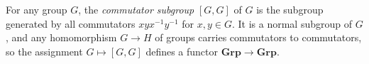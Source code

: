 For any group $G$, the \emph{commutator subgroup} $[G, G]$ of $G$ is the subgroup generated by all commutators $xyx^{-1}y^{-1}$ for $x, y \in G$. It is a normal subgroup of $G$, and any homomorphism $G \rightarrow H$ of groups carries commutators to commutators, so the assignment $G \mapsto [G, G]$ defines a functor $\mathbf{Grp} \rightarrow \mathbf{Grp}$.
